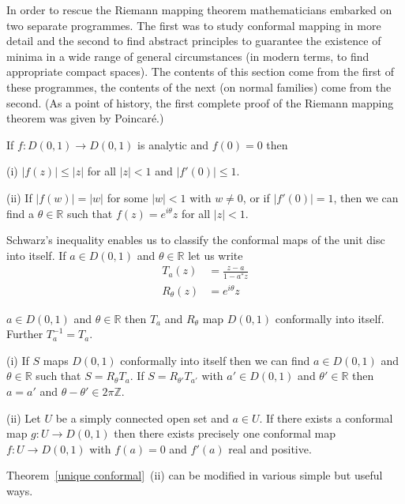 In order to rescue the Riemann mapping theorem
mathematicians embarked on two separate programmes.
The first was to study conformal mapping in more detail
and the second to find abstract principles to guarantee
the existence of minima in a wide range of general
circumstances (in modern terms, to find appropriate
compact spaces). The contents of this section
come from the first of these programmes,
the contents of the next (on normal families) come
from the second. (As a point of history, the first
complete proof of the Riemann mapping theorem
was given by Poincar\'{e}.)

\begin{theorem}%
\label{Schwarz's inequality}
If  $f:D(0,1)\rightarrow D(0,1)$ is analytic and
$f(0)=0$ then

(i) $|f(z)|\leq |z|$ for all $|z|<1$ and $|f'(0)|\leq 1$.

(ii) If $|f(w)|=|w|$ for some $|w|<1$ with $w\neq 0$,
or if $|f'(0)|=1$, then we can find a $\theta\in{\mathbb R}$
such that $f(z)=e^{i\theta}z$ for all $|z|<1$.
\end{theorem}

Schwarz's inequality enables us to classify the conformal
maps of the unit disc into itself. If $a\in D(0,1)$
and $\theta\in{\mathbb R}$ let us write
\begin{align*}
T_{a}(z)&=\frac{z-a}{1-a^{*}z}\\
R_{\theta}(z)&=e^{i\theta}z
\end{align*}
\begin{lemma} $a\in D(0,1)$
and $\theta\in{\mathbb R}$ then $T_{a}$ and $R_{\theta}$
map $D(0,1)$ conformally into itself. Further $T_{a}^{-1}=T_{a}$.
\end{lemma}
\begin{theorem}\label{unique conformal} 
(i) If $S$ maps $D(0,1)$ conformally into itself
then we can find $a\in D(0,1)$ and $\theta\in \mathbb{R}$
such that $S=R_{\theta}T_{a}$. If $S=R_{\theta'}T_{a'}$
with $a'\in D(0,1)$ and $\theta'\in \mathbb{R}$ then
$a=a'$ and $\theta-\theta'\in 2\pi{\mathbb Z}$.

(ii) Let $U$ be a simply connected open set and $a\in U$.
If there exists a
conformal map $g:U\rightarrow D(0,1)$
then there exists precisely one conformal map
$f:U\rightarrow D(0,1)$ with $f(a)=0$ and $f'(a)$ real
and positive.
\end{theorem} 
Theorem~\ref{unique conformal}~(ii) can be modified in various
simple but useful ways. 

